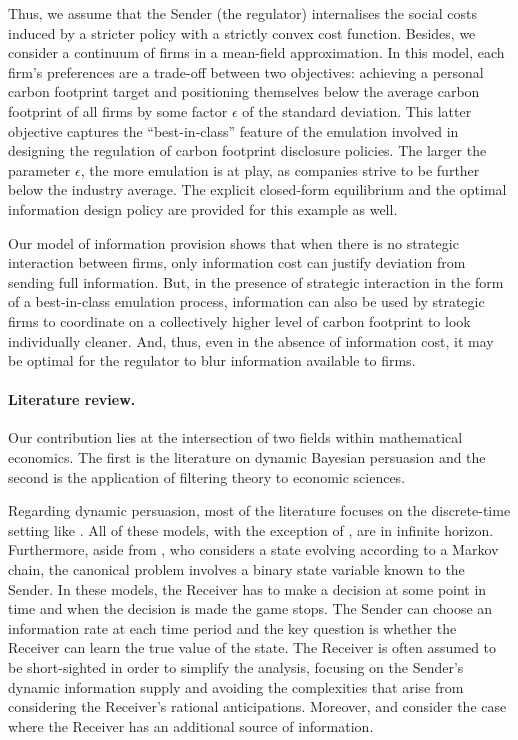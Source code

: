 \documentclass[a4paper,10pt]{article}
\theoremstyle{definition}
\theoremstyle{plain}
\numberwithin{equation}{section}
\begin{document}
Thus, we assume that the Sender (the regulator) internalises the social costs induced by a stricter policy with a strictly convex cost function. Besides, we consider a continuum of firms in a mean-field approximation.  In this model, each firm's preferences are a trade-off between two objectives:  achieving a personal carbon footprint target and positioning themselves below the average carbon footprint of all firms by some factor $\epsilon$ of the standard deviation. This latter objective captures the ``best-in-class'' feature of the emulation involved in designing the regulation of carbon footprint disclosure policies. The larger the parameter $\epsilon$, the more  emulation is at play, as companies strive to be further below the industry average. The explicit closed-form equilibrium and the optimal information design policy are provided for this example as well. 

Our model of information provision shows that when there is no strategic interaction between firms, only information cost can justify deviation from sending full information. But, in the presence of strategic interaction in the form of a best-in-class emulation process, information can also be used by strategic firms to coordinate on a collectively higher level of carbon footprint to look individually cleaner. And, thus, even in the absence of information cost, it may be optimal for the regulator to blur information available to firms. 


\paragraph{Literature review.} 
Our contribution lies at the intersection of two fields within mathematical economics. The first is the literature on dynamic Bayesian persuasion and the second is the application of filtering theory to economic sciences. 

Regarding dynamic persuasion, most of the literature focuses on the discrete-time setting like \cite{Renault13, Golosov14, Au15, Renault17, Bizzotto21, Bizzotto21b, Zhao24}.  All of these models, with the exception of \cite{Golosov14}, are in infinite horizon.  Furthermore, aside from \cite{Renault13}, who considers a state evolving according to a Markov chain, the canonical problem involves a binary state variable known to the Sender.  In these models, the Receiver has to make a decision at some point in time and when the decision is made the game stops. The Sender can choose an information rate at each time period and the key question is whether the Receiver can learn the true value of the state.  The Receiver is often assumed to be short-sighted in order to simplify the analysis, focusing on the Sender's dynamic information supply and avoiding the complexities that arise from considering the Receiver's rational anticipations.  Moreover, \cite{Bizzotto21} and \cite{Bizzotto21b} consider the case where the Receiver has an additional source of information.
\end{document}
